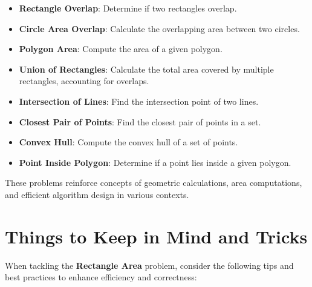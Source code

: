 \begin{itemize}
    \item \textbf{Rectangle Overlap}: Determine if two rectangles overlap.
    \item \textbf{Circle Area Overlap}: Calculate the overlapping area between two circles.
    \item \textbf{Polygon Area}: Compute the area of a given polygon.
    \item \textbf{Union of Rectangles}: Calculate the total area covered by multiple rectangles, accounting for overlaps.
    \item \textbf{Intersection of Lines}: Find the intersection point of two lines.
    \item \textbf{Closest Pair of Points}: Find the closest pair of points in a set.
    \item \textbf{Convex Hull}: Compute the convex hull of a set of points.
    \item \textbf{Point Inside Polygon}: Determine if a point lies inside a given polygon.
\end{itemize}

These problems reinforce concepts of geometric calculations, area computations, and efficient algorithm design in various contexts.

\section*{Things to Keep in Mind and Tricks}

When tackling the \textbf{Rectangle Area} problem, consider the following tips and best practices to enhance efficiency and correctness:

